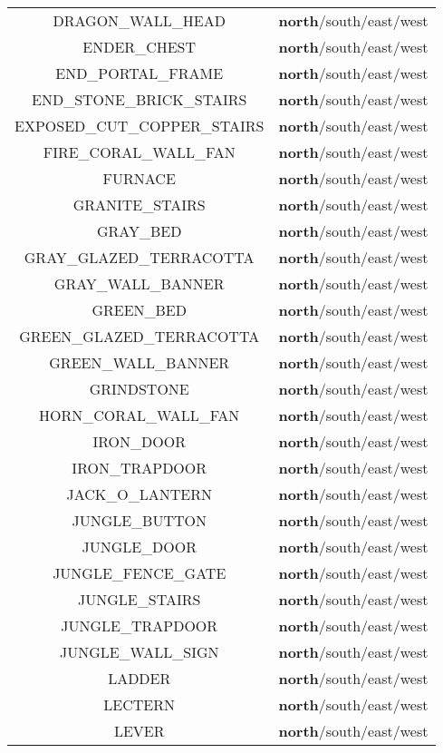 \begin{longtable}{ |c|c| }
	DRAGON\_WALL\_HEAD & \textbf{north}/south/east/west \\
	ENDER\_CHEST & \textbf{north}/south/east/west \\
	END\_PORTAL\_FRAME & \textbf{north}/south/east/west \\
	END\_STONE\_BRICK\_STAIRS & \textbf{north}/south/east/west \\
	EXPOSED\_CUT\_COPPER\_STAIRS & \textbf{north}/south/east/west \\
	FIRE\_CORAL\_WALL\_FAN & \textbf{north}/south/east/west \\
	FURNACE & \textbf{north}/south/east/west \\
	GRANITE\_STAIRS & \textbf{north}/south/east/west \\
	GRAY\_BED & \textbf{north}/south/east/west \\
	GRAY\_GLAZED\_TERRACOTTA & \textbf{north}/south/east/west \\
	GRAY\_WALL\_BANNER & \textbf{north}/south/east/west \\
	GREEN\_BED & \textbf{north}/south/east/west \\
	GREEN\_GLAZED\_TERRACOTTA & \textbf{north}/south/east/west \\
	GREEN\_WALL\_BANNER & \textbf{north}/south/east/west \\
	GRINDSTONE & \textbf{north}/south/east/west \\
	HORN\_CORAL\_WALL\_FAN & \textbf{north}/south/east/west \\
	IRON\_DOOR & \textbf{north}/south/east/west \\
	IRON\_TRAPDOOR & \textbf{north}/south/east/west \\
	JACK\_O\_LANTERN & \textbf{north}/south/east/west \\
	JUNGLE\_BUTTON & \textbf{north}/south/east/west \\
	JUNGLE\_DOOR & \textbf{north}/south/east/west \\
	JUNGLE\_FENCE\_GATE & \textbf{north}/south/east/west \\
	JUNGLE\_STAIRS & \textbf{north}/south/east/west \\
	JUNGLE\_TRAPDOOR & \textbf{north}/south/east/west \\
	JUNGLE\_WALL\_SIGN & \textbf{north}/south/east/west \\
	LADDER & \textbf{north}/south/east/west \\
	LECTERN & \textbf{north}/south/east/west \\
	LEVER & \textbf{north}/south/east/west \\

\end{longtable}
